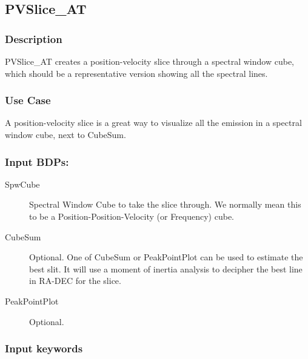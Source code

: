 
\subsection{PVSlice\_AT}

\subsubsection{Description}

PVSlice\_AT creates a position-velocity slice through a spectral
window cube, which
should be a representative version showing all the spectral lines.

\subsubsection{Use Case}

A position-velocity slice is a great way to visualize all the emission
in a spectral window cube, next to CubeSum.

\subsubsection{Input BDPs:}


\begin{description}

\item[SpwCube] Spectral Window Cube to take the slice through.  We normally
mean this to be a Position-Position-Velocity (or Frequency) cube.

\item[CubeSum]  Optional. One of CubeSum or PeakPointPlot can be used to
estimate the best slit.
It will use a moment of inertia analysis to decipher the best line 
in RA-DEC for the slice.

\item[PeakPointPlot]  Optional.


\end{description}


\subsubsection{Input keywords}

